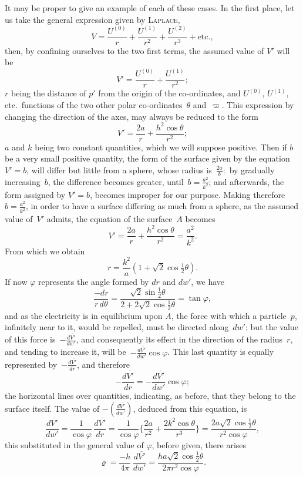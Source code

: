 \documentclass[11pt,notitlepage]{amsart}
\let\Person\textsc
\renewcommand{\rho}{\varrho}
\renewcommand{\phi}{\varphi}
\begin{document}
It may be proper to give an example of each of these cases. In the
first place, let us take the general expression given by \Person{Laplace},
\[
V=\frac{U^{(0)}}{r}
+\frac{U^{(1)}}{r^2}
+\frac{U^{(2)}}{r^3}
+\text{etc.},
\]
then, by confining ourselves to the two first terms, the assumed value of $V'$
will be
\[
V'=\frac{U^{(0)}}{r}
+\frac{U^{(1)}}{r^2};
\]
$r$ being the distance of $p'$ from the origin of the co-ordinates,
and $U^{(0)}$, $U^{(1)}$, etc.\ functions
of the two other polar co-ordinates~$\theta$ and~$\varpi$. This expression
by changing the direction of the axes, may always be reduced to
the form
\[
V'=\frac{2a}{r}+\frac{h^2\cos\theta}{r^2};
\]
$a$ and $k$ being two constant quantities, which we will suppose positive. Then
if $b$ be a very small positive quantity, the form of the surface given by the
equation~${V'=b}$, will differ but little from a sphere,
whose radius is~$\frac{2a}{b}:$
by gradually increasing~$b$,
the difference becomes greater, until~$b=\frac{a^2}{k^2}$; and
afterwards, the form assigned by $V'=b$, becomes improper for our purpose.
Making therefore ${b=\frac{a^2}{k^2}}$,
in order to have a surface differing as much from
a sphere, as the assumed value of~$V'$ admits,
the equation of the surface~$A$ becomes
\[
V'=\frac{2a}{r}+\frac{h^2\cos\theta}{r^2}=\frac{a^2}{k^2}.
\]
From which we obtain
\[
r=\frac{k^2}{a}(1+\sqrt2\cos\tfrac12\theta).
\]
If now $\phi$ represents the angle formed by $dr$ and $dw'$, we have
\[
\frac{-dr}{r\,d\theta}=
\frac{\sqrt2\sin\frac12\theta}{2+2\sqrt2\cos\frac12\theta}
=\tan\phi,
\]
and as the electricity is in equilibrium upon $A$,
the force with which a particle~$p$,
infinitely near to it, would be repelled, must be directed along~$dw'$:
but the value of this force is~$-\frac{d\overline{V'}}{dw'}$,
and consequently its effect in the direction
of the radius~$r$, and tending to increase it,
will be~$-\frac{d\overline{V'}}{dw'}\cos\phi$. This last
quantity is equally represented by~$-\frac{d\overline{V'}}{dr}$, and therefore
\[
-\frac{d\overline{V'}}{dr}
=-\frac{d\overline{V'}}{dw'}\cos\phi;
\]
the horizontal lines over quantities, indicating, as before, that they belong
to the surface itself. The value of $-(\frac{d\overline{V'}}{dw'})$,
deduced from this equation, is
\[
\frac{d\overline{V'}}{dw'}
=\frac{1}{\cos\phi}\,\frac{d\overline{V'}}{dr}
=\frac{1}{\cos\phi}\biggl\{\frac{2a}{r^2}+\frac{2k^2\cos\theta}{r^3}\biggr\}
=\frac{2a\sqrt2\cos\frac12\theta}{r^2\cos\phi},
\]
this substituted in the general value of $\phi$, before given, there arises
\[
\rho=\frac{-h}{4\pi}\,\frac{d\overline{V'}}{dw'}
=\frac{ha\sqrt2\cos\frac12\theta}{2\pi r^2\cos\phi}.
\]
\end{document}

